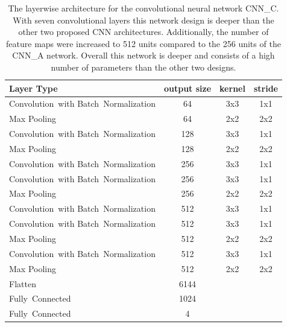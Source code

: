   \begin{table}[]
  \centering
  \begin{tabularx}{\textwidth}{Xccc}
  \toprule
Layer Type                                          & output size  & kernel & stride \\ \midrule
\mbox{Convolution with} \mbox{Batch Normalization}  & 64     & 3x3    & 1x1  \\ 
Max Pooling                                         & 64     & 2x2    & 2x2  \\ 
\mbox{Convolution with} \mbox{Batch Normalization}  & 128    & 3x3    & 1x1  \\ 
Max Pooling                                         & 128    & 2x2    & 2x2  \\ 
\mbox{Convolution with} \mbox{Batch Normalization}  & 256    & 3x3    & 1x1  \\ 
\mbox{Convolution with} \mbox{Batch Normalization}  & 256    & 3x3    & 1x1  \\ 
Max Pooling                                         & 256    & 2x2    & 2x2  \\ 
\mbox{Convolution with} \mbox{Batch Normalization}  & 512    & 3x3    & 1x1  \\ 
\mbox{Convolution with} \mbox{Batch Normalization}  & 512    & 3x3    & 1x1  \\ 
Max Pooling                                         & 512    & 2x2    & 2x2  \\ 
\mbox{Convolution with} \mbox{Batch Normalization}  & 512    & 3x3    & 1x1  \\ 
Max Pooling                                         & 512    & 2x2    & 2x2  \\ 
Flatten                                             & 6144   &        &      \\                        
\mbox{Fully Connected}                              & 1024   &        &      \\
\mbox{Fully Connected}                              & 4      &        &      \\
  \bottomrule
  \end{tabularx}
  \caption{The layerwise architecture for the convolutional neural network CNN\_C. With seven convolutional layers this network design is deeper than the other two proposed CNN architectures. Additionally, the number of feature maps were increased to 512 units compared to the 256 units of the CNN\_A network. Overall this network is deeper and consists of a high number of parameters than the other two designs.}
  \label{tab:layers_CNN_C}
  \end{table} 
    
